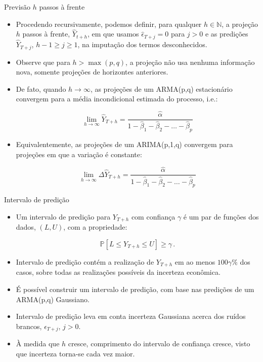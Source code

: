 \documentclass[11pt]{beamer}
\newenvironment{halfwideitemize}{\itemize\addtolength{\itemsep}{0.5em}}{\enditemize}
\begin{document}
\begin{frame}{Previsão $h$ passos à frente}
	\begin{itemize}
		\item Procedendo recursivamente, podemos definir, para qualquer $h \in \mathbb{N}$, a projeção $h$ passos à frente, $\hat Y_{t+h}$, em que usamos $\hat \epsilon_{T+j} = 0$ para $j > 0$ e as predições $\hat Y_{T+j}$, $h-1 \geq j \geq 1$, na imputação dos termos desconhecidos.
		\item Observe que para $h > \operatorname{max}(p,q)$, a projeção não usa nenhuma informação nova, somente projeções de horizontes anteriores.
		\item De fato, quando $h \to \infty$, as projeções de um ARMA(p,q) estacionário convergem para a média incondicional estimada do processo, i.e.:
		
		$$\lim_{h \to \infty} \hat Y_{T+h} = \frac{\hat \alpha}{1-\hat \beta_1  - \hat \beta_2 - \ldots - \hat \beta_p}$$
		
		\item Equivalentemente, as projeções de um ARIMA(p,1,q) convergem para projeções em que a variação é constante:
		
		$$\lim_{h \to \infty} \Delta \hat Y_{T+h} = \frac{\hat \alpha}{1-\hat \beta_1  - \hat \beta_2 - \ldots - \hat \beta_p}$$
		
	\end{itemize}
\end{frame}

\begin{frame}{Intervalo de predição}
	\begin{itemize}
		\item Um intervalo de predição para $Y_{T+h}$ com confiança $\gamma$ é um par de funções dos dados, $(L,U)$, com a propriedade:
		
		$$\mathbb{P}[L \leq Y_{T+h} \leq U] \geq \gamma\, .$$
		\item Intervalo de predição contém a realização de $Y_{T+h}$ em ao menos $100 \gamma\%$ dos casos, sobre todas as realizações possíveis da incerteza econômica.
		\item É possível construir um intervalo de predição, com base nas predições de um ARMA(p,q) Gaussiano.
		\begin{halfwideitemize}
			\item Intervalo de predição leva em conta incerteza Gaussiana acerca dos ruídos brancos, $\epsilon_{T+j}$, $j > 0$.
		\end{halfwideitemize}
		\item À medida que $h$ cresce, comprimento do intervalo de confiança cresce, visto que incerteza torna-se cada vez maior.
	\end{itemize}
	
\end{frame}
\end{document}
